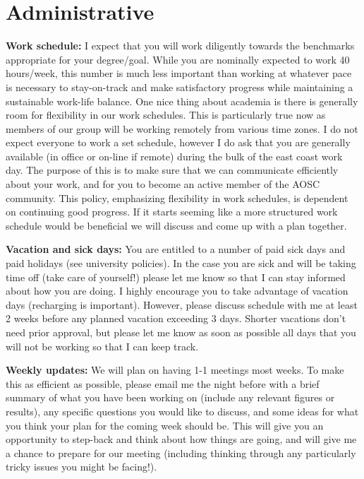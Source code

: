 \documentclass{classassignments}
\begin{document}
\section{Administrative}
\textbf{Work schedule:} I expect that you will work diligently towards the benchmarks appropriate for your degree/goal. While you are nominally expected to work 40 hours/week, this number is much less important than working at whatever pace is necessary to stay-on-track and make satisfactory progress while maintaining a sustainable work-life balance. One nice thing about academia is there is generally room for flexibility in our work schedules. This is particularly true now as members of our group will be working remotely from various time zones. I do not expect everyone to work a set schedule, however I do ask that you are generally available (in office or on-line if remote) during the bulk of the east coast work day. The purpose of this is to make sure that we can communicate efficiently about your work, and for you to become an active member of the AOSC community. This policy, emphasizing flexibility in work schedules, is dependent on continuing good progress. If it starts seeming like a more structured work schedule would be beneficial we will discuss and come up with a plan together.\bigskip

\textbf{Vacation and sick days:} You are entitled to a number of paid sick days and paid holidays (see university policies). In the case you are sick and will be taking time off (take care of yourself!) please let me know so that I can stay informed about how you are doing. I highly encourage you to take advantage of vacation days (recharging is important). However, please discuss schedule with me at least 2 weeks before any planned vacation exceeding 3 days. Shorter vacations don't need prior approval, but please let me know as soon as possible all days that you will not be working so that I can keep track.\bigskip

\textbf{Weekly updates:} We will plan on having 1-1 meetings most weeks. To make this as efficient as possible, please email me the night before with a brief summary of what you have been working on (include any relevant figures or results), any specific questions you would like to discuss, and some ideas for what you think your plan for the coming week should be. This will give you an opportunity to step-back and think about how things are going, and will give me a chance to prepare for our meeting (including thinking through any particularly tricky issues you might be facing!). \bigskip
\end{document}
